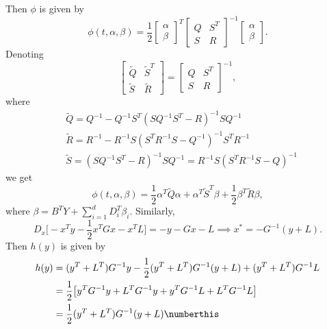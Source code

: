 Then $\phi$ is given by
\begin{equation*}
    \phi(t, \alpha, \beta) = 
    \frac12
    \begin{bmatrix}
        \alpha\\
        \beta
    \end{bmatrix}^T
    \begin{bmatrix}
        Q & S^T\\
        S & R
    \end{bmatrix}^{-1}
    \begin{bmatrix}
        \alpha\\
        \beta
    \end{bmatrix}.
\end{equation*}
Denoting
\begin{equation*}\begin{bmatrix}
        \tilde{Q} & \tilde{S}^T\\
        \tilde{S} & \tilde{R}
    \end{bmatrix}
    =
    \begin{bmatrix}
        Q & S^T\\
        S & R
    \end{bmatrix}^{-1},
\end{equation*}
where
\begin{align}
    &\tilde{Q} = Q^{-1} - Q^{-1} S^T (S Q^{-1} S^T - R)^{-1}S Q^{-1} \label{eq: tilde_q}\\
    &\tilde{R} = R^{-1} - R^{-1} S (S^T R^{-1}S - Q^{-1})^{-1}S^T R^{-1} \label{eq: tilde_r}\\
    &\tilde{S} = (S Q^{-1} S^T - R)^{-1}S Q^{-1} = R^{-1}S(S^TR^{-1}S - Q)^{-1} \label{eq: tilde_s}
\end{align}
we get
\begin{equation}
    \phi(t, \alpha, \beta) = \frac12 \alpha^T \tilde{Q} \alpha + \alpha^T \tilde{S}^T \beta + \frac12 \beta^T \tilde{R} \beta, \label{eq: phi}
\end{equation}
where $\beta = B^T Y + \sum_{i=1}^d D_i^T \beta_i$. Similarly, 
\begin{equation*}
    D_x \big[-x^T y - \frac12 x^T G x - x^T L \big] = -y - Gx - L \implies x^\ast = - G^{-1} (y + L).
\end{equation*}
Then $h(y)$ is given by
\begin{align*}
    h(y) &= (y^T + L^T) G^{-1} y - \frac12 (y^T + L^T)G^{-1}(y + L) + (y^T + L^T) G^{-1} L\\
    &= \frac12 \big[ y^T G^{-1} y +  L^T G^{-1} y + y^T G^{-1} L + L^T G^{-1} L\big]\\
    &= \frac12 (y^T + L^T)G^{-1}(y + L)\numberthis \label{eq: h}
\end{align*}


